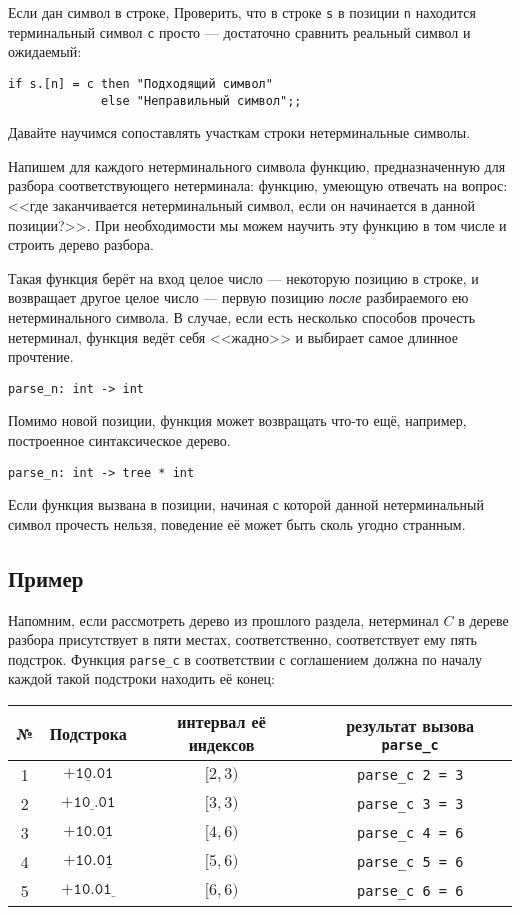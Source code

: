 \documentclass[12pt]{article}
\begin{document}
Если дан символ в строке, 
Проверить, что в строке \verb!s! в позиции \verb!n! находится терминальный символ
\verb!c! просто --- достаточно сравнить реальный символ и ожидаемый:
\begin{verbatim}
if s.[n] = c then "Подходящий символ" 
             else "Неправильный символ";;
\end{verbatim}
Давайте научимся сопоставлять участкам строки нетерминальные символы. 

Напишем для каждого нетерминального символа функцию, предназначенную
для разбора соответствующего нетерминала: функцию, умеющую отвечать на
вопрос: <<где заканчивается нетерминальный символ, если он начинается
в данной позиции?>>. При необходимости мы можем научить эту функцию
в том числе и строить дерево разбора.

Такая функция берёт на вход целое число --- некоторую позицию в строке, 
и возвращает другое целое число --- первую позицию \emph{после} 
разбираемого ею нетерминального символа. В случае, если есть несколько 
способов прочесть нетерминал, функция ведёт себя <<жадно>> и выбирает 
самое длинное прочтение.

\begin{verbatim}
parse_n: int -> int
\end{verbatim}

Помимо новой позиции, функция может возвращать что-то ещё, например,
построенное синтаксическое дерево.

\begin{verbatim}
parse_n: int -> tree * int
\end{verbatim}

Если функция вызвана в позиции, начиная с которой данной нетерминальный
символ прочесть нельзя, поведение её может быть сколь угодно странным.

\subsection{Пример}

Напомним, если рассмотреть дерево из прошлого раздела, нетерминал $C$ 
в дереве разбора присутствует в пяти местах, соответственно, соответствует
ему пять подстрок. Функция \verb!parse_c! в соответствии с соглашением
должна по началу каждой такой подстроки находить её конец:

\begin{tabular}{cccc}
№ &Подстрока & интервал её индексов & результат вызова \verb!parse_c!\\
\hline
1 & $\texttt{+1}\underline{\texttt{0}}\texttt{.01}$ & $[2,3)$ & \verb!parse_c 2 = 3! \\
2 & $\texttt{+10}\underline{\texttt{}}\texttt{.01}$ & $[3,3)$ & \verb!parse_c 3 = 3! \\
3 & $\texttt{+10.}\underline{\texttt{01}}\texttt{}$ & $[4,6)$ & \verb!parse_c 4 = 6! \\
4 & $\texttt{+10.0}\underline{\texttt{1}}\texttt{}$ & $[5,6)$ & \verb!parse_c 5 = 6! \\
5 & $\texttt{+10.01}\underline{\texttt{}}\texttt{}$ & $[6,6)$ & \verb!parse_c 6 = 6!
\end{tabular}
\end{document}
